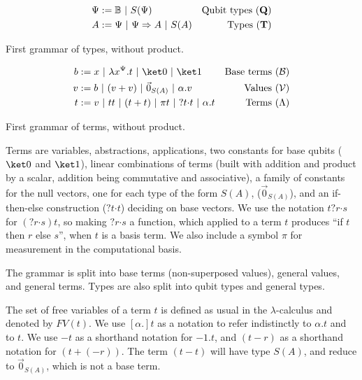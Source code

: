 \documentclass[preprint]{elsarticle}
\newcommand\B{\ensuremath{\mathbb B}}
\newcommand\gB{\ensuremath{\Psi}}
\newcommand\ite[3]{{#1}?{#2}\mathord{\cdot}{#3}}
\newcommand\pair[2]{({#1}+{#2})}
\newcommand\qtypes{\ensuremath{\mathbf Q}}
\newcommand\types{\ensuremath{\mathbf T}}
\newcommand\basis{\ensuremath{\mathcal B}}
\newcommand\values{\ensuremath{\mathcal V}}
\newcommand\z[1][A]{\vec 0_{S(#1)}}
\newcommand\may[1][\alpha]{[{#1}.]}
\begin{document}
\begin{table}
  \centering
  \begin{align*}
    \gB &:= \B~|~S(\gB) & \textrm{Qubit types ($\qtypes$)}\\
    A & := \gB~|~\gB\Rightarrow A~|~S(A) & \textrm{Types (\types)}
  \end{align*}
  \caption{First grammar of types, without product.}
  \label{tab:typesNoX}
\end{table}

\begin{table}
  \centering
  \begin{align*}
    b  & := x~|~\lambda x^{\gB}.t~|~\ket 0~|~\ket 1 & \textrm{Base terms (\basis)}\\
    v  & := b~|~\pair vv~|~\z~|~\alpha.v & \textrm{Values (\values)}\\
    t  & := v~|~tt~|~\pair tt~|~\pi t~|~\ite{}tt~|~\alpha.t & \textrm{Terms ($\Lambda$)}
  \end{align*}
  \caption{First grammar of terms, without product.}
  \label{tab:termsNoX}
\end{table}


Terms are variables, abstractions, applications, two constants for base qubits
($\ket 0$ and $\ket 1$), linear combinations of terms (built with addition and
product by a scalar, addition being commutative and associative), a family of
constants for the null vectors, one for each type of the form $S(A)$, ($\z$),
and an if-then-else construction ($\ite{}tt$) deciding on base vectors. We use
the notation $\ite trs$ for $(\ite{}rs)t$, so making $\ite{}rs$ a function, which applied to a term $t$ produces ``if $t$ then $r$ else $s$'', when $t$ is a basis term. We also include a symbol $\pi$ for
measurement in the computational basis.

The grammar is split into base terms (non-superposed values), general values,
and general terms. Types are also split into qubit types and general types.

The set of free variables of a term $t$ is defined as usual in the
$\lambda$-calculus and denoted by $FV(t)$. We use $\may t$ as a notation to
refer indistinctly to $\alpha.t$ and to $t$. We use $-t$ as a shorthand notation
for $-1.t$, and $(t-r)$ as a shorthand notation for $\pair t{(-r)}$. The term
$(t-t)$ will have type $S(A)$, and reduce to $\z$, which is not a base term.
\end{document}
